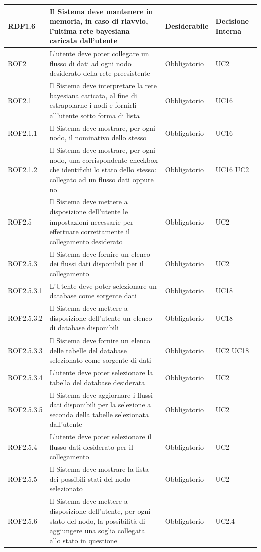\begin{center}
\begin{longtable}[c]{|m{}|m{}|m{}|m{}|}
\hline
RDF1.6 & Il Sistema deve mantenere in memoria, in caso di riavvio, l'ultima rete bayesiana caricata dall'utente & Desiderabile & Decisione Interna\\
\hline
\rowcolor{grigio}ROF2 & L'utente deve poter collegare un flusso di dati ad ogni nodo desiderato della rete preesistente & Obbligatorio & UC2\\
\hline
ROF2.1 & Il Sistema deve interpretare la rete bayesiana caricata, al fine di estrapolarne i nodi e fornirli all'utente sotto forma di lista & Obbligatorio & UC16\\
\hline
\rowcolor{grigio}ROF2.1.1 & Il Sistema deve mostrare, per ogni nodo, il nominativo dello stesso & Obbligatorio & UC16\\
\hline
ROF2.1.2 & Il Sistema deve mostrare, per ogni nodo, una corrispondente checkbox che identifichi lo stato dello stesso: collegato ad un flusso dati oppure no & Obbligatorio & UC16 UC2\\
\hline
\rowcolor{grigio}ROF2.5 & Il Sistema deve mettere a disposizione dell'utente le impostazioni necessarie per effettuare correttamente il collegamento desiderato & Obbligatorio & UC2\\
\hline
ROF2.5.3 & Il Sistema deve fornire un elenco dei flussi dati disponibili per il collegamento & Obbligatorio & UC2\\
\hline
ROF2.5.3.1 & L'Utente deve poter selezionare un database come sorgente dati & Obbligatorio & UC18\\
\hline
ROF2.5.3.2 & Il Sistema deve mettere a disposizione dell'utente un elenco di database disponibili & Obbligatorio & UC18\\
\hline
ROF2.5.3.3 & Il Sistema deve fornire un elenco delle tabelle del database selezionato come sorgente di dati & Obbligatorio & UC2 UC18\\
\hline
ROF2.5.3.4 & L'utente deve poter selezionare la tabella del database desiderata & Obbligatorio & UC2\\
\hline
ROF2.5.3.5 & Il Sistema deve aggiornare i flussi dati disponibili per la selezione a seconda della tabelle selezionata dall'utente & Obbligatorio & UC2\\
\hline
\rowcolor{grigio}ROF2.5.4 & L'utente deve poter selezionare il flusso dati desiderato per il collegamento & Obbligatorio & UC2\\
\hline
ROF2.5.5 & Il Sistema deve mostrare la lista dei possibili stati del nodo selezionato & Obbligatorio & UC2\\
\hline
\rowcolor{grigio}ROF2.5.6 & Il Sistema deve mettere a disposizione dell'utente, per ogni stato del nodo, la possibilità di aggiungere una soglia collegata allo stato in questione & Obbligatorio & UC2.4\\

\end{longtable}
\end{center}
